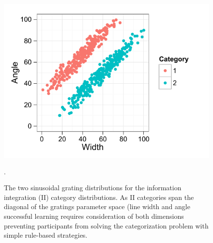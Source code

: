 \documentclass[doc,12pt]{apa}        %
\begin{document}
\begin{figure}[tp]
	\includegraphics{f_II}
    \centering
    \caption{The two sinusoidal grating distributions for the information integration (II) category distributions.   As II categories span the diagonal of the gratings parameter space (line width and angle successful learning requires consideration of both dimensions preventing participants from solving the categorization problem with simple rule-based strategies.}.
	\label{fig:II}
\end{figure}
\end{document}
